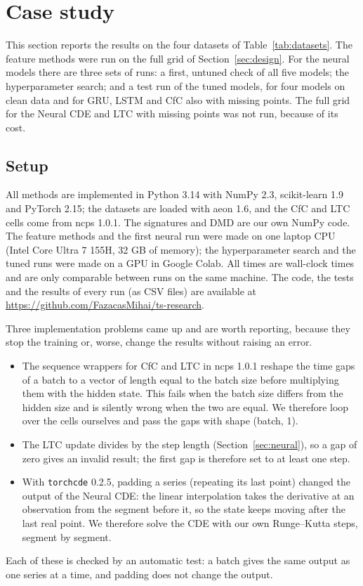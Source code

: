 \section{Case study}\label{sec:case}

This section reports the results on the four datasets of
Table~\ref{tab:datasets}. The feature methods were run on the full grid of
Section~\ref{sec:design}. For the neural models there are three sets of
runs: a first, untuned check of all five models; the hyperparameter
search; and a test run of the tuned models, for four models on clean data
and for GRU, LSTM and CfC also with missing points. The full grid for the
Neural CDE and LTC with missing points was not run, because of its cost.

\subsection{Setup}\label{sec:setup}

All methods are implemented in Python 3.14 with NumPy 2.3,
scikit-learn 1.9 \cite{pedregosa2011sklearn} and PyTorch 2.15; the
datasets are loaded with aeon 1.6, and the CfC and LTC cells come from
ncps 1.0.1. The signatures and DMD are our own NumPy code. The feature
methods and the first neural run were made on one laptop CPU (Intel Core
Ultra 7 155H, 32 GB of memory); the hyperparameter search and the tuned
runs were made on a GPU in Google Colab. All times are wall-clock times
and are only comparable between runs on the same machine. The code, the
tests and the results of every run (as CSV files) are available at
\url{https://github.com/FazacasMihai/ts-research}.

Three implementation problems came up and are worth reporting, because
they stop the training or, worse, change the results without raising an
error.
\begin{itemize}
\item The sequence wrappers for CfC and LTC in ncps 1.0.1 reshape the
time gaps of a batch to a vector of length equal to the batch size before
multiplying them with the hidden state. This fails when the batch size
differs from the hidden size and is silently wrong when the two are equal.
We therefore loop over the cells ourselves and pass the gaps with shape
(batch, 1).
\item The LTC update divides by the step length (Section~\ref{sec:neural}),
so a gap of zero gives an invalid result; the first gap is therefore set
to at least one step.
\item With \texttt{torchcde} 0.2.5, padding a series (repeating its last
point) changed the output of the Neural CDE: the linear interpolation
takes the derivative at an observation from the segment before it, so the
state keeps moving after the last real point. We therefore solve the CDE
with our own Runge--Kutta steps, segment by segment.
\end{itemize}
Each of these is checked by an automatic test: a batch gives the same
output as one series at a time, and padding does not change the output.

